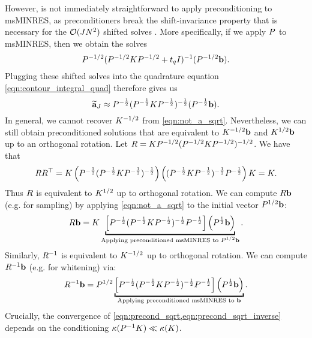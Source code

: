 However, is not immediately straightforward to apply preconditioning to msMINRES, as preconditioners break the shift-invariance property that is necessary for the $\bigo{JN^2}$ shifted solves \cite{jegerlehner1996krylov,aune2013iterative}.
More specifically, if we apply $P$ to msMINRES, then we obtain the solves
%
\[
	P^{-1 / 2} (P^{-1 / 2} K P^{-1 / 2} + t_q I)^{-1} (P^{-1 / 2} \mathbf{b}).
\]
%
Plugging these shifted solves into the quadrature equation \cref{eqn:contour_integral_quad} therefore gives us
%
\begin{equation}
	\widetilde {\mathbf{a}}_J \approx P^{-\frac 1 2} (P^{-\frac 1 2} K P^{-\frac 1 2})^{-\frac 1 2} (P^{-\frac 1 2} \mathbf{b}).
  \label{eqn:not_a_sqrt}
\end{equation}
%
In general, we cannot recover $K^{-1/2}$ from \cref{eqn:not_a_sqrt}.
Nevertheless, we can still obtain preconditioned solutions that are equivalent to $K^{-1/2} \mathbf{b}$ and $K^{1/2} \mathbf{b}$ up to an orthogonal rotation.
Let $R = K P^{-1/2} (P^{-1/2} K P^{-1/2})^{-1/2}$.
We have that
%
\begin{align*}
  R R^\top
	=
	K \left( P^{-\frac 1 2} (P^{-\frac 1 2} K P^{-\frac 1 2})^{-\frac 1 2} \right)
	\left( (P^{-\frac 1 2} K P^{-\frac 1 2})^{-\frac 1 2} P^{-\frac 1 2} \right) K
  = K.
\end{align*}
%
Thus $ R $ is equivalent to $K^{1/2}$ up to orthogonal rotation.
We can compute $R \mathbf{b}$ (e.g. for sampling) by applying \cref{eqn:not_a_sqrt} to the initial vector $P^{1/2} \mathbf{b}$:
%
\begin{align}
  \bR \bb
  =
  \bK
  \underbracket{%
    \Bigl[ \bP^{-\frac 1 2} (\bP^{-\frac 1 2} \bK \bP^{-\frac 1 2})^{-\frac 1 2} \bP^{-\frac 1 2} \Bigr]
    \left( \bP^{\frac 1 2} \bb \right)
  }_{\text{Applying preconditioned msMINRES to $\bP^{1/2} \bb$}}.
  \label{eqn:precond_sqrt}
\end{align}
%
Similarly, $R^{-1}$ is equivalent to $K^{-1/2}$ up to orthogonal rotation.
We can compute $R^{-1} \mathbf{b}$ (e.g. for whitening) via:
%
\begin{align}
  \bR^{-1} \bb
  =
  \bP^{1/2} \underbracket{%
    \Bigl[ \bP^{-\frac 1 2} (\bP^{-\frac 1 2} \bK \bP^{-\frac 1 2})^{-\frac 1 2} \bP^{-\frac 1 2} \Bigr]
    \left( \bP^{\frac 1 2} \bb \right)
  }_{\text{Applying preconditioned msMINRES to $\bb$}}.
  \label{eqn:precond_sqrt_inverse}
\end{align}
%
Crucially, the convergence of \cref{eqn:precond_sqrt,eqn:precond_sqrt_inverse} depends on the conditioning $\kappa(P^{-1} K) \ll \kappa(K)$.


